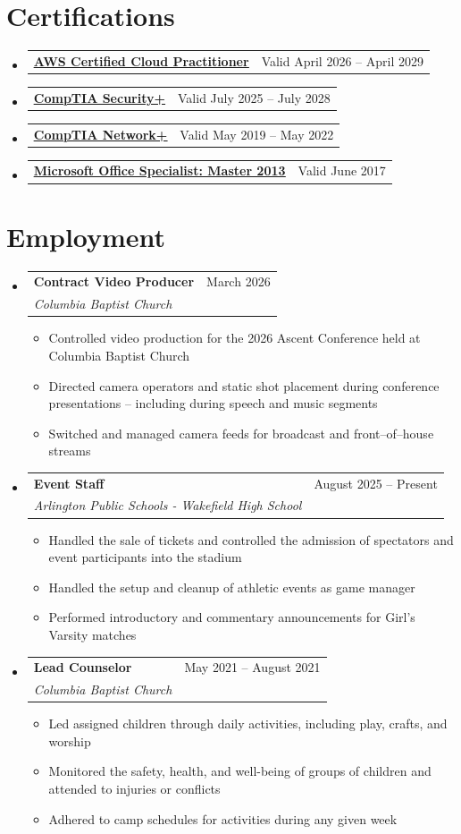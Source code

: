\documentclass[letterpaper,11pt]{article}
\makeatletter
\newcommand{\resumeItem}[1]{
  \item\small{
    {#1 \vspace{-2pt}}
  }
}
\newcommand{\resumeEmploymentHeading}[3]{
    \item
    \begin{tabular*}{0.97\textwidth}{l@{\extracolsep{\fill}}r}
      \textbf{\small#1} & #3 \\
      \textit{\small#2} \\
    \end{tabular*}\vspace{-7pt}
}
\newcommand{\resumeCertificationsHeading}[3]{
    \item
    \begin{tabular*}{0.97\textwidth}{l@{\extracolsep{\fill}}r}
      \href{#2}{\underline{\textbf{\small#1}}} & Valid #3 \\
    \end{tabular*}\vspace{-7pt}
}
\newcommand{\resumeSubHeadingListStart}{\begin{itemize}[leftmargin=0.15in, label={}]}
\newcommand{\resumeSubHeadingListEnd}{\end{itemize}}
\newcommand{\resumeItemListStart}{\begin{itemize}}
\newcommand{\resumeItemListEnd}{\end{itemize}\vspace{-5pt}}
\makeatother
\begin{document}
\section{Certifications}
    \resumeSubHeadingListStart
            \resumeCertificationsHeading
          {AWS Certified Cloud Practitioner}{https://www.credly.com/badges/f86e5a8b-c615-47b5-9bdb-4d7a16cd2622}{April 2026 -- April 2029}
      \resumeCertificationsHeading
          {CompTIA Security+}{https://www.credly.com/badges/b1780bab-be84-424d-93fc-add1db80c42c}{July 2025 -- July 2028}
      \resumeCertificationsHeading
          {CompTIA Network+}{https://www.credly.com/badges/948ff074-63c5-490a-9517-bb8d9d89b983}{May 2019 -- May 2022}
      \resumeCertificationsHeading
          {Microsoft Office Specialist: Master 2013}{https://www.credly.com/badges/94223946-5124-49c0-bbb8-59648259a075}{June 2017}
    \resumeSubHeadingListEnd

\section{Employment}
    \resumeSubHeadingListStart
      \resumeEmploymentHeading
          {Contract Video Producer}{Columbia Baptist Church}{March 2026}
          \resumeItemListStart
            \resumeItem{Controlled video production for the 2026 Ascent Conference held at Columbia Baptist Church}
            \resumeItem{Directed camera operators and static shot placement during conference presentations -- including during speech and music segments}
            \resumeItem{Switched and managed camera feeds for broadcast and front--of--house streams}
          \resumeItemListEnd
      \resumeEmploymentHeading
          {Event Staff}{Arlington Public Schools - Wakefield High School}{August 2025 -- Present}
          \resumeItemListStart
            \resumeItem{Handled the sale of tickets and controlled the admission of spectators and event participants into the stadium}
            \resumeItem{Handled the setup and cleanup of athletic events as game manager}
            \resumeItem{Performed introductory and commentary announcements for Girl's Varsity matches}
          \resumeItemListEnd
      \resumeEmploymentHeading
          {Lead Counselor}{Columbia Baptist Church}{May 2021 -- August 2021}
          \resumeItemListStart
            \resumeItem{Led assigned children through daily activities, including play, crafts, and worship}
            \resumeItem{Monitored the safety, health, and well-being of groups of children and attended to injuries or conflicts}
            \resumeItem{Adhered to camp schedules for activities during any given week}
          \resumeItemListEnd
    \resumeSubHeadingListEnd
\end{document}
